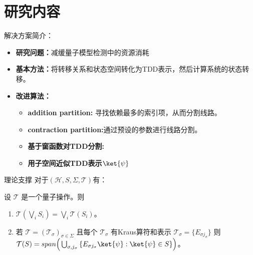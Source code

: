 \documentclass[aspectratio=1610]{ctexbeamer}
\begin{document}
\section{研究内容}
\begin{frame}{解决方案简介：}
    \begin{itemize}
        \item \textbf{研究问题：}减缓量子模型检测中的资源消耗
        \item \textbf{基本方法：}将转移关系和状态空间转化为TDD表示，然后计算系统的状态转移。
        \item \textbf{改进算法：}
        \begin{itemize}
            \item \textbf{addition partition:} 寻找依赖最多的索引项，从而分割线路。
            \item \textbf{contraction partition:}通过预设的参数进行线路分割。
        \end{itemize}
        \begin{itemize}
            \item \textbf{基于窗函数对TDD分割:}
            \item \textbf{用子空间近似TDD表示$\ket{\psi}$}
        \end{itemize}
    \end{itemize}
\end{frame}
\begin{frame}{理论支撑}
    对于$(\mathcal{H},S,\Sigma,\mathcal{T})$有：
    \begin{theorem}
        \label{theorem-model}
        设 $\mathcal{T}$ 是一个量子操作。则
    \begin{enumerate}
        \item $\mathcal{T}(\bigvee_{i}{S_i})=\bigvee_{i}{\mathcal{T}(S_i)}$。
        \item 若 $\mathcal{T}=(\mathcal{T}_\sigma)_{\sigma \in \Sigma}$ 且每个 $\mathcal{T}_{\sigma}$ 有Kraus算符和表示 $\mathcal{T}_{\sigma}= \{ E_{\sigma j_\sigma} \}$
    则
    $\mathcal{T}(S)=span\Big(\bigcup_{\sigma,j_\sigma}{\{E_{\sigma j_\sigma}\ket{\psi}:\ket{\psi}\in S\}}\Big)$。
    \end{enumerate}
    \end{theorem}
\end{frame}
\end{document}
